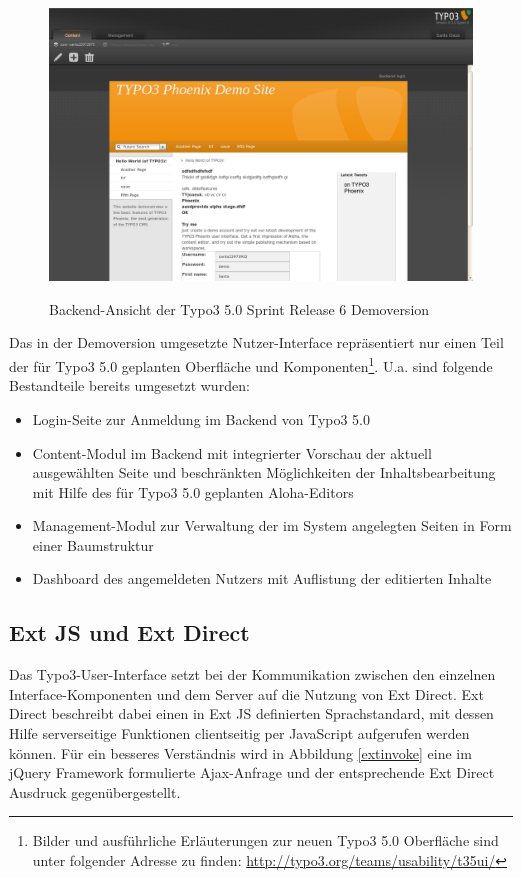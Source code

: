 \begin{figure}[!h]
\begin{center}
\label{fig.typo3backend}
\includegraphics[scale=0.35]{images/typo3/backend.png}
\caption{Backend-Ansicht der Typo3 5.0 Sprint Release 6 Demoversion}
\end{center}
\end{figure}
\newpage
Das in der Demoversion umgesetzte Nutzer-Interface repräsentiert nur einen Teil der für Typo3 5.0 geplanten Oberfläche und Komponenten\footnote{Bilder und ausführliche Erläuterungen zur neuen Typo3 5.0 Oberfläche sind unter folgender Adresse zu finden: \href{http://typo3.org/teams/usability/t35ui/}{http://typo3.org/teams/usability/t35ui/}}. U.a. sind folgende Bestandteile bereits umgesetzt wurden:
\begin{itemize}
\item
Login-Seite zur Anmeldung im Backend von Typo3 5.0
\item
Content-Modul im Backend mit integrierter Vorschau der aktuell ausgewählten Seite und beschränkten Möglichkeiten der Inhaltsbearbeitung mit Hilfe des für Typo3 5.0 geplanten Aloha-Editors
\item
Management-Modul zur Verwaltung der im System angelegten Seiten in Form einer Baumstruktur
\item
Dashboard des angemeldeten Nutzers mit Auflistung der editierten Inhalte
\end{itemize}


\subsection{Ext JS und Ext Direct}

Das Typo3-User-Interface setzt bei der Kommunikation zwischen den einzelnen Interface-Komponenten und dem Server auf die Nutzung von Ext Direct. Ext Direct beschreibt dabei einen in Ext JS definierten Sprachstandard, mit dessen Hilfe serverseitige Funktionen clientseitig per JavaScript aufgerufen werden können.
Für ein besseres Verständnis wird in Abbildung \ref{extinvoke} eine im jQuery Framework formulierte Ajax-Anfrage und der entsprechende Ext Direct Ausdruck gegenübergestellt.

